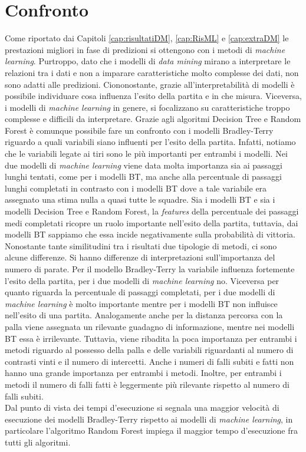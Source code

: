 \section{Confronto}
Come riportato dai Capitoli \ref{cap:risultatiDM}, \ref{cap:RisML} e  \ref{cap:extraDM} le prestazioni migliori in fase di predizioni si ottengono con i metodi di \emph{machine learning}. Purtroppo, dato che i modelli di \emph{data mining} mirano a interpretare le relazioni tra i dati e non a imparare caratteristiche molto complesse dei dati, non sono adatti alle predizioni. Ciononostante, grazie all'interpretabilità di modelli è possibile individuare cosa influenza l'esito della partita e in che misura. Viceversa, i modelli di \emph{machine learning} in genere, si focalizzano su caratteristiche troppo complesse e difficili da interpretare. Grazie agli algoritmi Decision Tree e Random Forest è comunque possibile fare un confronto con i modelli Bradley-Terry riguardo a quali variabili siano influenti per l'esito della partita.
Infatti, notiamo che le variabili legate ai tiri sono le più importanti per entrambi i modelli. Nei due modelli di \emph{machine learning} viene data molta importanza sia ai passaggi lunghi tentati, come per i modelli BT, ma anche alla percentuale di passaggi lunghi completati in contrasto con i modelli BT dove a tale variabile era assegnato una stima nulla a quasi tutte le squadre. 
Sia i modelli BT e sia i modelli Decision Tree e Random Forest, la \emph{features} della percentuale dei passaggi medi completati ricopre un ruolo importante nell'esito della partita, tuttavia, dai modelli BT sappiamo che essa incide negativamente sulla probabilità di vittoria.
Nonostante tante similitudini tra i risultati due tipologie di metodi, ci sono alcune differenze. Si hanno differenze di interpretazioni sull'importanza del numero di parate. Per il modello Bradley-Terry la variabile influenza fortemente l'esito della partita, per i due modelli di \emph{machine learning} no. Viceversa per quanto riguarda la percentuale di passaggi completati, per i due modelli di \emph{machine learning} è molto importante mentre per i modelli BT non influisce nell'esito di una partita. Analogamente anche per la distanza percorsa con la palla viene assegnata un rilevante guadagno di informazione, mentre nei modelli BT essa è irrilevante. Tuttavia, viene ribadita la poca importanza per entrambi i metodi riguardo al possesso della palla e delle variabili riguardanti al numero di contrasti vinti e il numero di intercetti. Anche i numeri di falli subiti e fatti non hanno una grande importanza per entrambi i metodi. Inoltre, per entrambi i metodi il numero di falli fatti è leggermente più rilevante rispetto al numero di falli subiti.\\
Dal punto di vista dei tempi d'esecuzione si segnala una maggior velocità di esecuzione dei modelli Bradley-Terry rispetto ai modelli di \emph{machine learning}, in particolare l'algoritmo Random Forest impiega il maggior tempo d'esecuzione fra tutti gli algoritmi.


